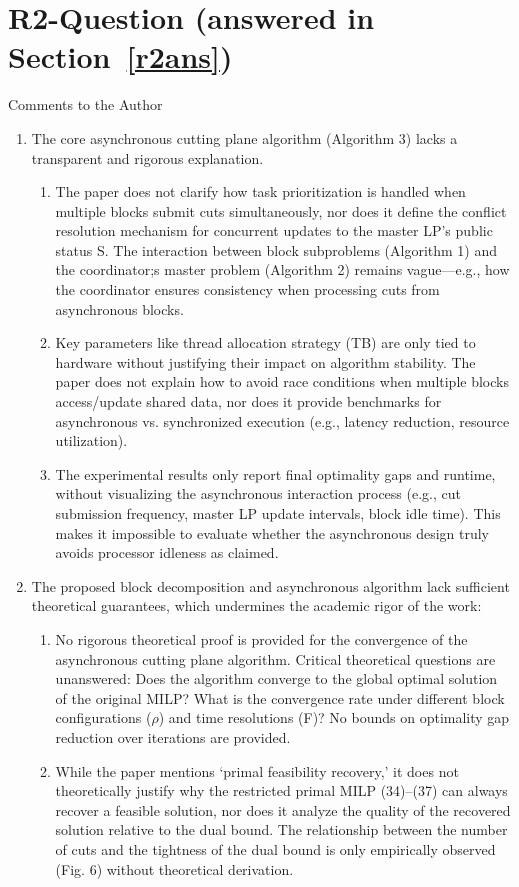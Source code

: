 \documentclass[11pt]{article}
\newcommand{\sect}[1]{\textbf{Section}~\ref{#1}}
\begin{document}
\section{R2-Question (answered in \sect{r2ans})}
Comments to the Author
\begin{enumerate}
    \item The core asynchronous cutting plane algorithm (Algorithm 3) lacks a transparent and rigorous explanation.
    \begin{enumerate}
        \item The paper does not clarify how task prioritization is handled when multiple blocks submit cuts simultaneously, nor does it define the conflict resolution mechanism for concurrent updates to the master LP's public status S. The interaction between block subproblems (Algorithm 1) and the coordinator;s master problem (Algorithm 2) remains vague—e.g., how the coordinator ensures consistency when processing cuts from asynchronous blocks.
        \item Key parameters like thread allocation strategy (TB) are only tied to hardware without justifying their impact on algorithm stability. The paper does not explain how to avoid race conditions when multiple blocks access/update shared data, nor does it provide benchmarks for asynchronous vs. synchronized execution (e.g., latency reduction, resource utilization).
        \item The experimental results only report final optimality gaps and runtime, without visualizing the asynchronous interaction process (e.g., cut submission frequency, master LP update intervals, block idle time). This makes it impossible to evaluate whether the asynchronous design truly avoids processor idleness as claimed.
    \end{enumerate}
    \item The proposed block decomposition and asynchronous algorithm lack sufficient theoretical guarantees, which undermines the academic rigor of the work:
    \begin{enumerate}
        \item No rigorous theoretical proof is provided for the convergence of the asynchronous cutting plane algorithm. Critical theoretical questions are unanswered: Does the algorithm converge to the global optimal solution of the original MILP? What is the convergence rate under different block configurations ($\rho$) and time resolutions (F)? No bounds on optimality gap reduction over iterations are provided.
        \item While the paper mentions `primal feasibility recovery,' it does not theoretically justify why the restricted primal MILP (34)--(37) can always recover a feasible solution, nor does it analyze the quality of the recovered solution relative to the dual bound. The relationship between the number of cuts and the tightness of the dual bound is only empirically observed (Fig. 6) without theoretical derivation.

\end{enumerate}
\end{enumerate}
\end{document}
